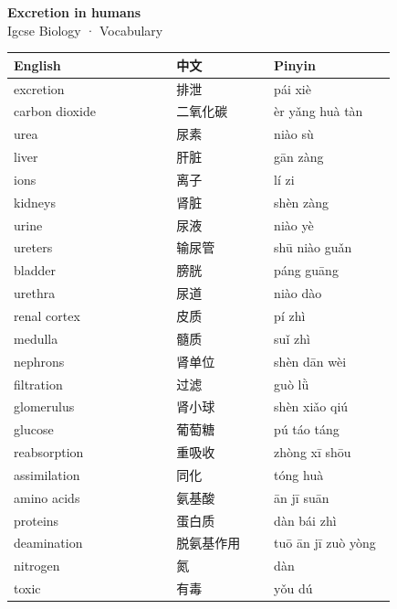 \documentclass[11pt]{article}
\begin{document}
\begin{center}
  {\LARGE\bfseries Excretion in humans}\\[0.35em]
  {\large Igcse Biology · Vocabulary}
\end{center}
\vspace{0.6em}

\begin{longtable}{@{}p{0.40\linewidth}p{0.24\linewidth}p{0.30\linewidth}@{}}
\toprule
\textbf{English} & \textbf{中文} & \textbf{Pinyin} \\
\midrule
\endhead
\bottomrule
\endlastfoot
excretion & 排泄 & pái xiè \\
carbon dioxide & 二氧化碳 & èr yǎng huà tàn \\
urea & 尿素 & niào sù \\
liver & 肝脏 & gān zàng \\
ions & 离子 & lí zi \\
kidneys & 肾脏 & shèn zàng \\
urine & 尿液 & niào yè \\
ureters & 输尿管 & shū niào guǎn \\
bladder & 膀胱 & páng guāng \\
urethra & 尿道 & niào dào \\
renal cortex & 皮质 & pí zhì \\
medulla & 髓质 & suǐ zhì \\
nephrons & 肾单位 & shèn dān wèi \\
filtration & 过滤 & guò lǜ \\
glomerulus & 肾小球 & shèn xiǎo qiú \\
glucose & 葡萄糖 & pú táo táng \\
reabsorption & 重吸收 & zhòng xī shōu \\
assimilation & 同化 & tóng huà \\
amino acids & 氨基酸 & ān jī suān \\
proteins & 蛋白质 & dàn bái zhì \\
deamination & 脱氨基作用 & tuō ān jī zuò yòng \\
nitrogen & 氮 & dàn \\
toxic & 有毒 & yǒu dú \\
\end{longtable}
\end{document}
